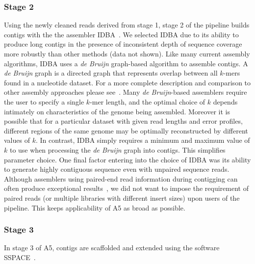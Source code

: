 \documentclass[10pt]{article}
\begin{document}
\subsubsection*{Stage 2}
Using the newly cleaned reads derived from stage 1, stage 2 of the pipeline builds contigs
with the the assembler IDBA~\cite{Peng2010}. We selected IDBA due 
to its ability to produce long contigs in the presence of inconsistent depth of sequence coverage more robustly than other methods (data not shown).
Like many current assembly algorithms, IDBA uses a \emph{de Bruijn} graph-based algorithm to assemble contigs. A \emph{de Bruijn} graph is a directed graph 
that represents overlap between all $k$-mers found in a nucleotide dataset. For a more complete description and comparison to other assembly 
approaches please see~\cite{Pop2009}. Many \emph{de Bruijn}-based assemblers require the user to specify a single $k$-mer length, and the optimal 
choice of $k$ depends intimately on characteristics of the genome being assembled.  Moreover it is possible that for a particular dataset with given 
read lengths and error profiles, different regions of the same genome may be optimally reconstructed by different values of $k$. In contrast, IDBA
simply requires a minimum and maximum value of $k$ to use when processing the \emph{de Bruijn} graph into contigs. This simplifies parameter choice. 
One final factor entering into the choice of IDBA was its 
ability to generate highly contiguous sequence even with unpaired sequence reads. Although assemblers using paired-end read information during 
contigging can often produce exceptional results~\cite{Gnerre2011, SASSY}, we did not want to impose the requirement of paired reads (or multiple
libraries with different insert sizes) upon users of the pipeline. This keeps applicability of A5 as broad as possible.

\subsubsection*{Stage 3}
In stage 3 of A5, contigs are scaffolded and extended using the software SSPACE~\cite{Boetzer2011}. 
\end{document}
